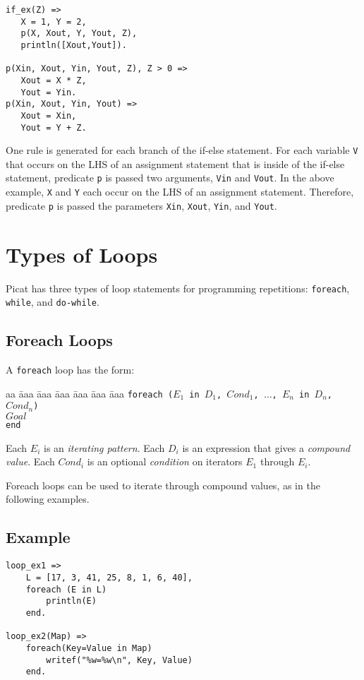 \begin{verbatim}
if_ex(Z) => 
   X = 1, Y = 2, 
   p(X, Xout, Y, Yout, Z),
   println([Xout,Yout]).

p(Xin, Xout, Yin, Yout, Z), Z > 0 =>
   Xout = X * Z,
   Yout = Yin.
p(Xin, Xout, Yin, Yout) =>
   Xout = Xin,
   Yout = Y + Z.
\end{verbatim}
One rule is generated for each branch of the if-else statement.  For each variable \texttt{V} that occurs on the LHS of an assignment statement that is inside of the if-else statement, predicate \texttt{p} is passed two arguments, \texttt{Vin} and \texttt{Vout}.  In the above example, \texttt{X} and \texttt{Y} each occur on the LHS of an assignment statement.  Therefore, predicate \texttt{p} is passed the parameters \texttt{Xin}, \texttt{Xout}, \texttt{Yin}, and \texttt{Yout}. 

\section{Types of Loops}
Picat has three types of loop statements for programming repetitions: \texttt{foreach}, \texttt{while}, and \texttt{do-while}.

\subsection{Foreach Loops}
A \texttt{foreach} loop has the form:
\begin{tabbing}
aa \= aaa \= aaa \= aaa \= aaa \= aaa \= aaa \kill
\> \texttt{foreach ($E_1$ in $D_1$, $Cond_1$, $\ldots$, $E_n$ in $D_n$, $Cond_n$)}  \\
\> \> $Goal$ \\
\>  \texttt{end} 
\end{tabbing}
Each $E_i$ is an \emph{iterating pattern}.  Each $D_i$ is an expression that gives a \emph{compound value}.  Each $Cond_i$ is an optional \emph{condition} on iterators $E_1$ through $E_i$.

Foreach loops can be used to iterate through compound values, as in the following examples.

\subsection*{Example}
\begin{verbatim}
loop_ex1 =>
    L = [17, 3, 41, 25, 8, 1, 6, 40],
    foreach (E in L)
        println(E)
    end.

loop_ex2(Map) =>
    foreach(Key=Value in Map)
        writef("%w=%w\n", Key, Value)
    end.
\end{verbatim}

